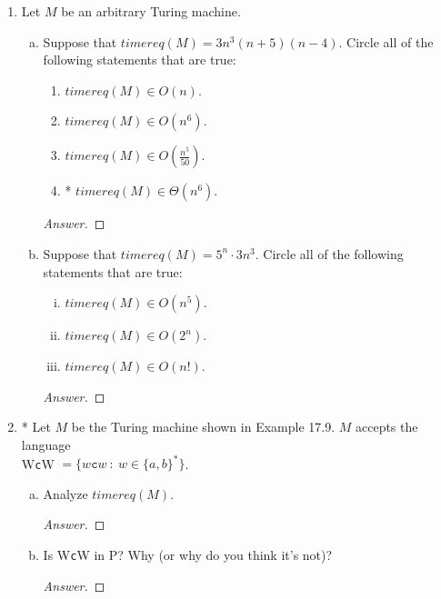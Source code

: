 \documentclass[10pt]{article}
\newcommand{\brackets}[1]{\left< #1 \right>}
\begin{document}
\begin{enumerate}[1)]
For whatever reason (malevolence or incompetence), it turns out that $Oops$ has the property that, for all input pairs, it outputs the value \texttt{F}.\\

For this problem, we’ll say that two TMs are equivalent iff they compute the same function (i.e., they halt on the same inputs and, when they halt, they output the same value).\\

Define $L = \{\brackets{M}$ : $M$ is equivalent to $Oops$\}.  Is $L$ in D, SD/D or $\lnot$SD?  Prove your answer.
\begin{proof}[Answer]
\end{proof}
\begin{proof}[Proof]
\end{proof}


\item
Let $M$ be an arbitrary Turing machine.
\begin{enumerate}[a)]
\item
Suppose that $timereq(M) = 3n^3(n+5)(n-4)$.  Circle all of the following statements that are true:
\begin{enumerate}[i]
\item
$timereq(M) \in O(n)$.
\item
$timereq(M) \in O(n^6)$.
\item
$timereq(M) \in O(\frac{n^5}{50})$.
\item
* $timereq(M) \in \Theta(n^6)$.
\end{enumerate}
\begin{proof}[Answer]
\end{proof}

\item
Suppose that $timereq(M) = 5^n \cdot 3n^3$.  Circle all of the following statements that are true:
\begin{enumerate}[i)]
\item
$timereq(M) \in O(n^5)$.
\item
$timereq(M) \in O(2^n)$.
\item
$timereq(M) \in O(n!)$.
\end{enumerate}
\begin{proof}[Answer]
\end{proof}
\end{enumerate}


\item
* Let $M$ be the Turing machine shown in Example 17.9.  $M$ accepts the language\\ W\texttt{c}W $= \{w\texttt{c}w\ :\ w \in \{a, b\}^*\}$.
\begin{enumerate}[a)]
\item
Analyze $timereq(M)$.
\begin{proof}[Answer]
\end{proof}
\item
Is W\texttt{c}W in P?  Why (or why do you think it’s not)?
\begin{proof}[Answer]
\end{proof}
\end{enumerate}


\end{enumerate}
\end{document}
